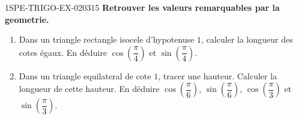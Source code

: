 \begin{exercice}{1SPE-TRIGO-EX-020}{3}{15}
\textbf{Retrouver les valeurs remarquables par la geometrie.}
\begin{enumerate}
  \item Dans un triangle rectangle isocele d'hypotenuse $1$, calculer la longueur des cotes égaux. En déduire $\cos\!\left(\dfrac{\pi}{4}\right)$ et $\sin\!\left(\dfrac{\pi}{4}\right)$.
  \item Dans un triangle equilateral de cote $1$, tracer une hauteur. Calculer la longueur de cette hauteur. En déduire $\cos\!\left(\dfrac{\pi}{6}\right)$, $\sin\!\left(\dfrac{\pi}{6}\right)$, $\cos\!\left(\dfrac{\pi}{3}\right)$ et $\sin\!\left(\dfrac{\pi}{3}\right)$.
\end{enumerate}
\end{exercice}
